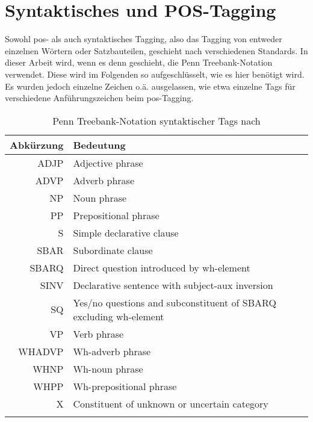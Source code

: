 \chapter{Syntaktisches und POS-Tagging}\label{ch:tagging}

Sowohl \ac{pos}- als auch syntaktisches Tagging, also das Tagging von entweder einzelnen Wörtern oder Satzbauteilen, geschieht nach verschiedenen Standards.
In dieser Arbeit wird, wenn es denn geschieht, die Penn Treebank-Notation verwendet.
Diese wird im Folgenden so aufgeschlüsselt, wie es hier benötigt wird.
Es wurden jedoch einzelne Zeichen o.ä. ausgelassen, wie etwa einzelne Tags für verschiedene Anführungszeichen beim \ac{pos}-Tagging.

\begin{longtable}{r l}
  \toprule
  Abkürzung & Bedeutung \\
  \midrule
  \endhead
  ADJP & Adjective phrase \\
  ADVP & Adverb phrase \\
  NP & Noun phrase \\
  PP & Prepositional phrase \\
  S & Simple declarative clause \\
  SBAR & Subordinate clause \\
  SBARQ & Direct question introduced by wh-element \\
  SINV & Declarative sentence with subject-aux inversion \\
  SQ & Yes/no questions and subconstituent of SBARQ excluding wh-element \\
  VP & Verb phrase \\
  WHADVP & Wh-adverb phrase \\
  WHNP & Wh-noun phrase \\
  WHPP & Wh-prepositional phrase \\
  X & Constituent of unknown or uncertain category \\
  \bottomrule
  \caption[Penn Treebank-Notation syntaktischer Tags]{Penn Treebank-Notation syntaktischer Tags nach \citet{penntreebankpos}}
  \label{tab:penntreebanksynt}
\end{longtable}

